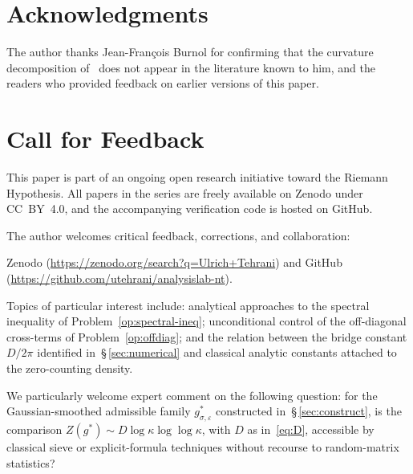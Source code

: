 \documentclass[11pt]{article}
\begin{document}
\section*{Acknowledgments}

The author thanks Jean-Fran\c{c}ois Burnol for confirming that
the curvature decomposition of~\cite{Paper1} does not appear in
the literature known to him, and the readers who provided
feedback on earlier versions of this paper.

\section*{Call for Feedback}

This paper is part of an ongoing open research initiative
toward the Riemann Hypothesis.
All papers in the series are freely available on Zenodo under
CC~BY~4.0, and the accompanying verification code is hosted on
GitHub.

The author welcomes critical feedback, corrections, and
collaboration:
{\sloppy
Zenodo (\url{https://zenodo.org/search?q=Ulrich+Tehrani}) and
GitHub (\url{https://github.com/utehrani/analysislab-nt}).
\par}

Topics of particular interest include: analytical approaches to
the spectral inequality of Problem~\ref{op:spectral-ineq};
unconditional control of the off-diagonal cross-terms of
Problem~\ref{op:offdiag}; and the relation between the bridge
constant $D/2\pi$ identified in~\S\,\ref{sec:numerical} and
classical analytic constants attached to the zero-counting
density.

We particularly welcome expert comment on the following
question: for the Gaussian-smoothed admissible family
$g^*_{\sigma,\varepsilon}$ constructed in~\S\,\ref{sec:construct},
is the comparison $Z(g^*)\sim D\log\kappa\log\log\kappa$, with
$D$ as in~\eqref{eq:D}, accessible by classical sieve or
explicit-formula techniques without recourse to random-matrix
statistics?
\end{document}
